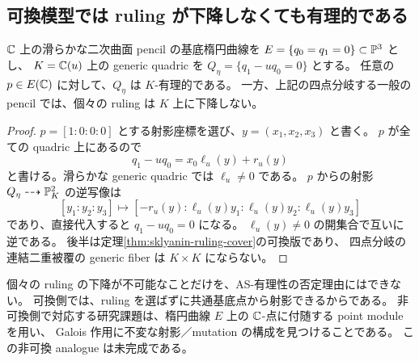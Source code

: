 \subsection{可換模型では ruling が下降しなくても有理的である}
\begin{proposition}[共通基底点からの射影]\label{prop:sklyanin-classical-projection}
$\mathbb C$ 上の滑らかな二次曲面 pencil の基底楕円曲線を
$E=\{q_0=q_1=0\}\subset\mathbb P^3$ とし、
$K=\mathbb C(u)$ 上の generic quadric を $Q_\eta=\{q_1-uq_0=0\}$ とする。
任意の $p\in E(\mathbb C)$ に対して、$Q_\eta$ は $K$-有理的である。
一方、上記の四点分岐する一般の pencil では、個々の ruling は
$K$ 上に下降しない。
\end{proposition}
\begin{proof}
$p=[1:0:0:0]$ とする射影座標を選び、$y=(x_1,x_2,x_3)$ と書く。
$p$ が全ての quadric 上にあるので
\[
 q_1-uq_0=x_0\ell_u(y)+r_u(y)
\]
と書ける。滑らかな generic quadric では $\ell_u\ne0$ である。
$p$ からの射影 $Q_\eta\dashrightarrow\mathbb P^2_K$ の逆写像は
\[
 [y_1:y_2:y_3]\longmapsto
 [-r_u(y):\ell_u(y)y_1:\ell_u(y)y_2:\ell_u(y)y_3]
\]
であり、直接代入すると $q_1-uq_0=0$ になる。
$\ell_u(y)\ne0$ の開集合で互いに逆である。
後半は定理\ref{thm:sklyanin-ruling-cover}の可換版であり、
四点分岐の連結二重被覆の generic fiber は $K\times K$ にならない。
\end{proof}

\begin{remark}[研究上の帰結]
個々の ruling の下降が不可能なことだけを、AS-有理性の否定理由にはできない。
可換側では、ruling を選ばずに共通基底点から射影できるからである。
非可換側で対応する研究課題は、楕円曲線 $E$ 上の $\mathbb C$-点に付随する point module を用い、
Galois 作用に不変な射影／mutation の構成を見つけることである。
この非可換 analogue は未完成である。
\end{remark}

